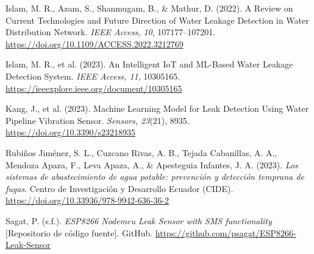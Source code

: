 \documentclass[12pt,a4paper]{article}
\begin{document}
\begin{enumerate}[label={[\arabic*]}, leftmargin=*, nosep, itemsep=0.4em]
\item Islam, M. R., Azam, S., Shanmugam, B., \& Mathur, D. (2022). A Review on Current
Technologies and Future Direction of Water Leakage Detection in Water Distribution
Network. \textit{IEEE Access, 10}, 107177--107201.
\url{https://doi.org/10.1109/ACCESS.2022.3212769}

\item Islam, M. R., et al. (2023). An Intelligent IoT and ML-Based Water Leakage
Detection System. \textit{IEEE Access, 11}, 10305165.
\url{https://ieeexplore.ieee.org/document/10305165}

\item Kang, J., et al. (2023). Machine Learning Model for Leak Detection Using Water
Pipeline Vibration Sensor. \textit{Sensors, 23}(21), 8935.
\url{https://doi.org/10.3390/s23218935}

\item Rubiños Jiménez, S. L., Cuzcano Rivas, A. B., Tejada Cabanillas, A. A., Mendoza
Apaza, F., Leva Apaza, A., \& Apesteguia Infantes, J. A. (2023). \textit{Los sistemas de
abastecimiento de agua potable: prevención y detección temprana de fugas}. Centro de
Investigación y Desarrollo Ecuador (CIDE).
\url{https://doi.org/10.33936/978-9942-636-36-2}

\item Sagat, P. (s.f.). \textit{ESP8266 Nodemcu Leak Sensor with SMS functionality}
[Repositorio de código fuente]. GitHub.
\url{https://github.com/psagat/ESP8266-Leak-Sensor}

\end{enumerate}
\end{document}
